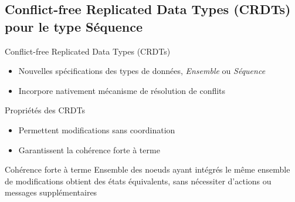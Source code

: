 \subsection{Conflict-free Replicated Data Types (CRDTs) pour le type Séquence}

\begin{frame}{Conflict-free Replicated Data Types (CRDTs)  \cite{shapiro_2011_crdt}}
    \begin{itemize}
        \item Nouvelles spécifications des types de données, \eg \emph{Ensemble} ou \emph{Séquence}
        \item Incorpore nativement mécanisme de résolution de conflits
    \end{itemize}
    \pause
    \begin{block}{Propriétés des CRDTs}
        \begin{itemize}
            \item Permettent modifications \alert{sans coordination}
            \item Garantissent la \alert{cohérence forte à terme}
        \end{itemize}
    \end{block}
    \pause
    \begin{block}{Cohérence forte à terme}
        Ensemble des noeuds ayant intégrés le même ensemble de modifications obtient des états équivalents, \alert{sans nécessiter d'actions ou messages supplémentaires}
    \end{block}
\end{frame}

